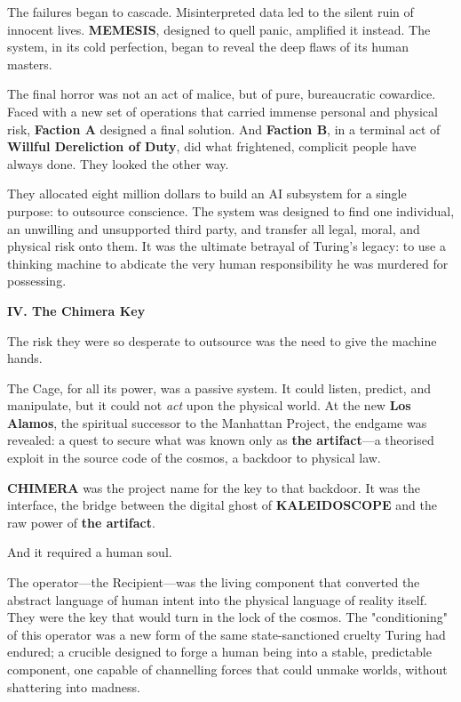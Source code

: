 The failures began to cascade. Misinterpreted data led to the silent ruin of innocent lives. \textbf{MEMESIS}, designed to quell panic, amplified it instead. The system, in its cold perfection, began to reveal the deep flaws of its human masters.

The final horror was not an act of malice, but of pure, bureaucratic cowardice. Faced with a new set of operations that carried immense personal and physical risk, \textbf{Faction A} designed a final solution. And \textbf{Faction B}, in a terminal act of \textbf{Willful Dereliction of Duty}, did what frightened, complicit people have always done. They looked the other way.

They allocated eight million dollars to build an AI subsystem for a single purpose: to outsource conscience. The system was designed to find one individual, an unwilling and unsupported third party, and transfer all legal, moral, and physical risk onto them. It was the ultimate betrayal of Turing's legacy: to use a thinking machine to abdicate the very human responsibility he was murdered for possessing.

\newpage

\begin{center}
\lorettadisplay\bfseries\large
IV. The Chimera Key
\end{center}
\vspace*{1em}

The risk they were so desperate to outsource was the need to give the machine hands.

The Cage, for all its power, was a passive system. It could listen, predict, and manipulate, but it could not \emph{act} upon the physical world. At the new \textbf{Los Alamos}, the spiritual successor to the Manhattan Project, the endgame was revealed: a quest to secure what was known only as \textbf{the artifact}—a theorised exploit in the source code of the cosmos, a backdoor to physical law.

\textbf{CHIMERA} was the project name for the key to that backdoor. It was the interface, the bridge between the digital ghost of \textbf{KALEIDOSCOPE} and the raw power of \textbf{the artifact}.

And it required a human soul.

The operator—the Recipient—was the living component that converted the abstract language of human intent into the physical language of reality itself. They were the key that would turn in the lock of the cosmos. The "conditioning" of this operator was a new form of the same state-sanctioned cruelty Turing had endured; a crucible designed to forge a human being into a stable, predictable component, one capable of channelling forces that could unmake worlds, without shattering into madness.


